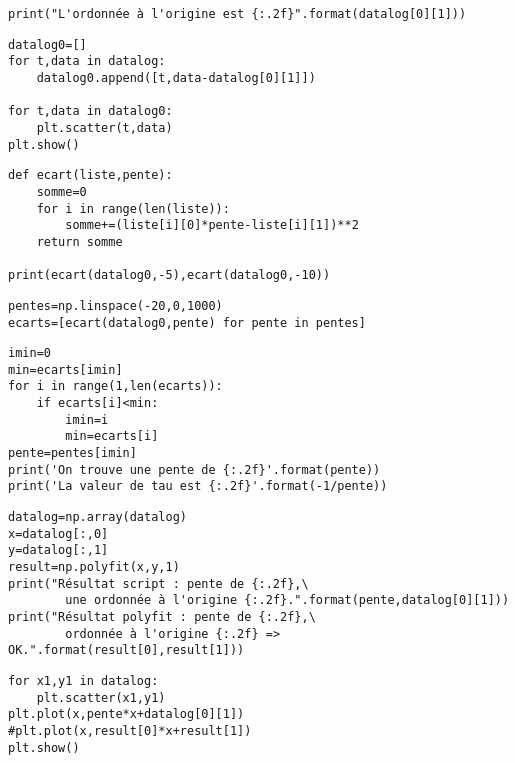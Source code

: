 \reponse{}

\begin{verbatim}
print("L'ordonnée à l'origine est {:.2f}".format(datalog[0][1]))
\end{verbatim}

\reponse{}

\begin{verbatim}
datalog0=[]
for t,data in datalog:
    datalog0.append([t,data-datalog[0][1]])

for t,data in datalog0:
    plt.scatter(t,data)
plt.show()
\end{verbatim}

\reponse{}

\begin{verbatim}
def ecart(liste,pente):
    somme=0
    for i in range(len(liste)):
        somme+=(liste[i][0]*pente-liste[i][1])**2
    return somme

print(ecart(datalog0,-5),ecart(datalog0,-10))
\end{verbatim}

\reponse{}

\begin{verbatim}
pentes=np.linspace(-20,0,1000)
ecarts=[ecart(datalog0,pente) for pente in pentes]
\end{verbatim}

\reponse{}

\begin{verbatim}
imin=0
min=ecarts[imin]
for i in range(1,len(ecarts)):
    if ecarts[i]<min:
        imin=i
        min=ecarts[i]
pente=pentes[imin]
print('On trouve une pente de {:.2f}'.format(pente))
print('La valeur de tau est {:.2f}'.format(-1/pente))
\end{verbatim}

\reponse{}

\begin{verbatim}
datalog=np.array(datalog)
x=datalog[:,0]
y=datalog[:,1]
result=np.polyfit(x,y,1)
print("Résultat script : pente de {:.2f},\
		une ordonnée à l'origine {:.2f}.".format(pente,datalog[0][1]))
print("Résultat polyfit : pente de {:.2f},\
		ordonnée à l'origine {:.2f} => OK.".format(result[0],result[1]))
\end{verbatim}

\reponse{}

\begin{verbatim}
for x1,y1 in datalog:
    plt.scatter(x1,y1)
plt.plot(x,pente*x+datalog[0][1])
#plt.plot(x,result[0]*x+result[1])
plt.show()
\end{verbatim}


